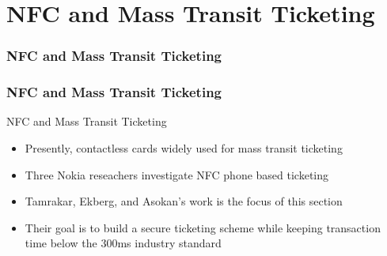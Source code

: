 \documentclass[unknownkeysallowed]{beamer}
\begin{document}
\section{NFC and Mass Transit Ticketing}
\begin{frame}
\frametitle{NFC and Mass Transit Ticketing}
\begin{center}\begin{minipage}{.9\textwidth}
\tableofcontents[currentsubsection, hideothersubsections, sectionstyle=show/shaded]
\end{minipage}\end{center}
\end{frame}
%

\begin{frame}
\frametitle{NFC and Mass Transit Ticketing}
  \begin{center}
  \begin{minipage}{.9\textwidth}
  \begin{block}{NFC and Mass Transit Ticketing}
    \begin{itemize}
      \item{Presently, contactless cards widely used for mass transit ticketing}
      \pause
      \vspace{1mm}
      \item{Three Nokia reseachers investigate NFC phone based ticketing}
      \pause
      \vspace{1mm}
      \item{Tamrakar, Ekberg, and Asokan's work is the focus of this section}
      \pause
      \vspace{1mm}
      \item{Their goal is to build a secure ticketing scheme while keeping transaction time below the 300ms industry standard}
    \end{itemize}
  \end{block}
  \end{minipage}
  \end{center}
\end{frame}
\end{document}
